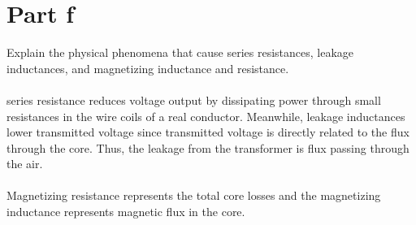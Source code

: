 \documentclass{article}
\begin{document}
\section*{Part f}
Explain the physical phenomena that cause series resistances, leakage inductances, and magnetizing inductance and resistance.\\
\\series resistance reduces voltage output by dissipating power through small resistances in the wire coils of a real conductor. Meanwhile, leakage inductances lower transmitted voltage since transmitted voltage is directly related to the flux through the core. Thus, the leakage from the transformer is flux passing through the air.\\
\\Magnetizing resistance represents the total core losses and the magnetizing inductance represents magnetic flux in the core.
\end{document}
